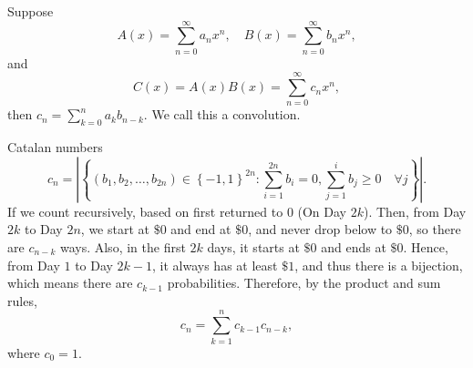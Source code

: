 \begin{prev}
    Suppose
    \[
    A(x) = \sum_{n=0}^{\infty} a_n x^n, \quad B(x) = \sum_{n=0}^{\infty} b_n x^n, 
\] and 
\[
    C(x) = A(x)B(x) = \sum_{n=0}^{\infty} c_n x^n, 
\] then \(c_n = \sum_{k=0}^n a_k b_{n-k} \). We call this a convolution. 
\end{prev}

\begin{prev}
    Catalan numbers 
    \[
        c_n = \left\vert \left\{ (b_1, b_2, \dots , b_{2n}) \in \left\{ -1, 1 \right\}^{2n}: \sum_{i=1}^{2n} b_i = 0, \sum_{j=1}^i b_j \ge 0 \quad \forall j \right\}  \right\vert. 
    \]
    If we count recursively, based on first returned to \(0\) (On Day \(2k\)). Then, from Day \(2k\) to Day \(2n\), we start at \(\$ 0\) and end at \(\$ 0\), and never drop below to \(\$ 0\), so there are \(c_{n-k}\) ways. Also, in the first \(2k\) days, it starts at \(\$ 0\) and ends at \(\$ 0\). Hence, from Day \(1\) to Day \(2k - 1\), it always has at least \(\$ 1\), and thus there is a bijection, which means there are \(c_{k - 1}\) probabilities. Therefore, by the product and sum rules, 
    \[
        c_n = \sum_{k=1}^n c_{k-1} c_{n-k}, 
    \] where \(c_0 = 1\).               
\end{prev}

